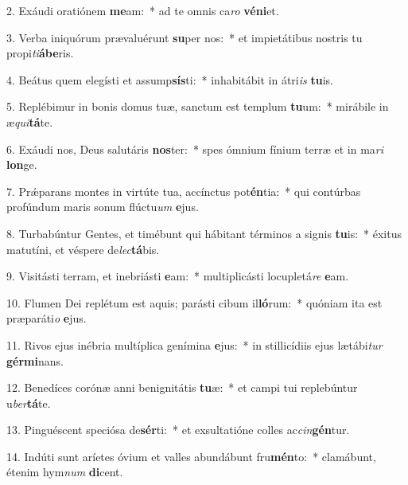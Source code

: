 2. Exáudi oratiónem \textbf{me}am:~*  ad te omnis ca\textit{ro} \textbf{vé}\textbf{ni}et.\

3. Verba iniquórum prævaluérunt \textbf{su}per nos:~*  et impietátibus nostris tu propi\textit{ti}\textbf{á}\textbf{be}ris.\

4. Beátus quem elegísti et assump\textbf{sís}ti:~*  inhabitábit in átri\textit{is} \textbf{tu}is.\

5. Replébimur in bonis domus tuæ, sanctum est templum \textbf{tu}um:~*  mirábile in æ\textit{qui}\textbf{tá}te.\

6. Exáudi nos, Deus salutáris \textbf{nos}ter:~*  spes ómnium fínium terræ et in ma\textit{ri} \textbf{lon}ge.\

7. Prǽparans montes in virtúte tua, accínctus pot\textbf{én}tia:~*  qui contúrbas profúndum maris sonum flúctu\textit{um} \textbf{e}jus.\

8. Turbabúntur Gentes, et timébunt qui hábitant términos a signis \textbf{tu}is:~*  éxitus matutíni, et véspere de\textit{lec}\textbf{tá}bis.\

9. Visitásti terram, et inebriásti \textbf{e}am:~*  multiplicásti locupletá\textit{re} \textbf{e}am.\

10. Flumen Dei replétum est aquis; parásti cibum il\textbf{ló}rum:~*  quóniam ita est præparáti\textit{o} \textbf{e}jus.\

11. Rivos ejus inébria multíplica genímina \textbf{e}jus:~*  in stillicídiis ejus lætábi\textit{tur} \textbf{gér}\textbf{mi}nans.\

12. Benedíces corónæ anni benignitátis \textbf{tu}æ:~*  et campi tui replebúntur u\textit{ber}\textbf{tá}te.\

13. Pinguéscent speciósa de\textbf{sér}ti:~*  et exsultatióne colles ac\textit{cin}\textbf{gén}tur.\

14. Indúti sunt aríetes óvium et valles abundábunt fru\textbf{mén}to:~*  clamábunt, étenim hym\textit{num} \textbf{di}cent.\

